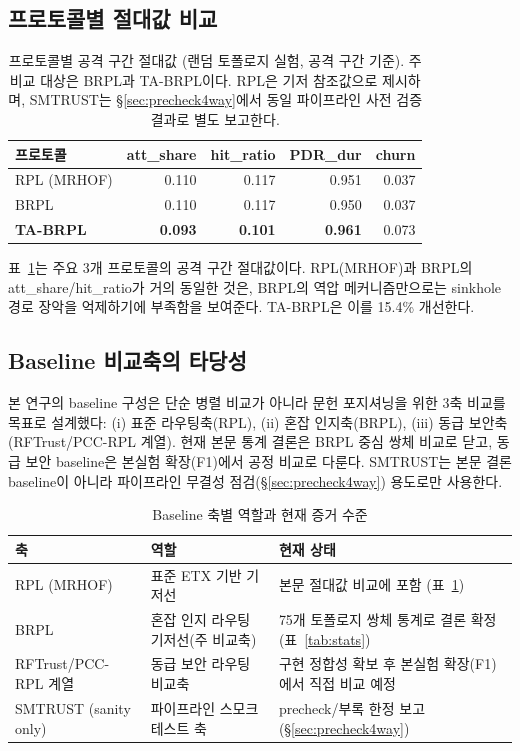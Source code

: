 \documentclass[12pt,a4paper]{article}
\begin{document}
\subsection{프로토콜별 절대값 비교}

\begin{table}[t]
\centering
\caption{프로토콜별 공격 구간 절대값 (랜덤 토폴로지 실험, 공격 구간 기준).
  주 비교 대상은 BRPL과 TA-BRPL이다.
  RPL은 기저 참조값으로 제시하며, SMTRUST는 \S\ref{sec:precheck4way}에서
  동일 파이프라인 사전 검증 결과로 별도 보고한다.}
\label{tab:absolute}
\begin{tabular}{lrrrr}
\toprule
프로토콜 & att\_share & hit\_ratio & PDR\_dur & churn \\
\midrule
RPL (MRHOF)     & 0.110 & 0.117 & 0.951 & 0.037 \\
BRPL            & 0.110 & 0.117 & 0.950 & 0.037 \\
\textbf{TA-BRPL}& \textbf{0.093} & \textbf{0.101} & \textbf{0.961} & 0.073 \\
\bottomrule
\end{tabular}
\end{table}

표~\ref{tab:absolute}는 주요 3개 프로토콜의 공격 구간 절대값이다.
RPL(MRHOF)과 BRPL의 att\_share/hit\_ratio가 거의 동일한 것은,
BRPL의 역압 메커니즘만으로는 sinkhole 경로 장악을 억제하기에
부족함을 보여준다.
TA-BRPL은 이를 15.4\% 개선한다.

\subsection{Baseline 비교축의 타당성}

본 연구의 baseline 구성은 단순 병렬 비교가 아니라
문헌 포지셔닝을 위한 3축 비교를 목표로 설계했다:
(i) 표준 라우팅축(RPL), (ii) 혼잡 인지축(BRPL),
(iii) 동급 보안축(RFTrust/PCC-RPL 계열).
현재 본문 통계 결론은 BRPL 중심 쌍체 비교로 닫고,
동급 보안 baseline은 본실험 확장(F1)에서 공정 비교로 다룬다.
SMTRUST는 본문 결론 baseline이 아니라
파이프라인 무결성 점검(\S\ref{sec:precheck4way}) 용도로만 사용한다.

\begin{table}[t]
\centering
\caption{Baseline 축별 역할과 현재 증거 수준}
\label{tab:baseline_axis_status}
\begin{tabular}{p{2.5cm}p{5.0cm}p{4.8cm}}
\toprule
축 & 역할 & 현재 상태 \\
\midrule
RPL (MRHOF) & 표준 ETX 기반 기저선 & 본문 절대값 비교에 포함 (표~\ref{tab:absolute}) \\
BRPL & 혼잡 인지 라우팅 기저선(주 비교축) & 75개 토폴로지 쌍체 통계로 결론 확정 (표~\ref{tab:stats}) \\
RFTrust/PCC-RPL 계열 & 동급 보안 라우팅 비교축 & 구현 정합성 확보 후 본실험 확장(F1)에서 직접 비교 예정 \\
SMTRUST (sanity only) & 파이프라인 스모크 테스트 축 & precheck/부록 한정 보고 (\S\ref{sec:precheck4way}) \\
\bottomrule
\end{tabular}
\end{table}
\end{document}

